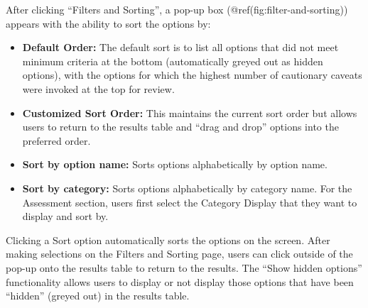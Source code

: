 \documentclass[11pt,]{book}
\providecommand{\tightlist}{%
  \setlength{\itemsep}{0pt}\setlength{\parskip}{0pt}}
\begin{document}
After clicking ``Filters and Sorting'', a pop-up box
(@ref(fig:filter-and-sorting)) appears with the ability to sort the
options by:

\begin{itemize}
\tightlist
\item
  \textbf{Default Order:} The default sort is to list all options that
  did not meet minimum criteria at the bottom (automatically greyed out
  as hidden options), with the options for which the highest number of
  cautionary caveats were invoked at the top for review.
\item
  \textbf{Customized Sort Order:} This maintains the current sort order
  but allows users to return to the results table and ``drag and drop''
  options into the preferred order.
\item
  \textbf{Sort by option name:} Sorts options alphabetically by option
  name.
\item
  \textbf{Sort by category:} Sorts options alphabetically by category
  name. For the Assessment section, users first select the Category
  Display that they want to display and sort by.
\end{itemize}

Clicking a Sort option automatically sorts the options on the screen.
After making selections on the Filters and Sorting page, users can click
outside of the pop-up onto the results table to return to the results.
The ``Show hidden options'' functionality allows users to display or not
display those options that have been ``hidden'' (greyed out) in the
results table.
\end{document}
